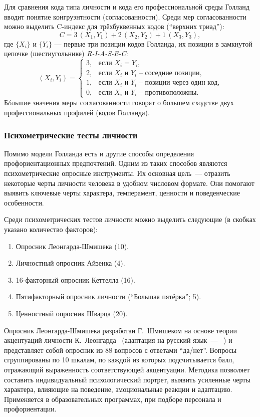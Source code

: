 \label{subsec:cindex}
Для сравнения кода типа личности и кода его профессиональной среды Голланд вводит понятие конгруэнтности (согласованности). Среди мер согласованности можно выделить C‑индекс для трёхбуквенных кодов (\enquote{верхних триад}):
  \[
    C = 3\, (X_1, Y_1) + 2\, (X_2, Y_2) + 1\, (X_3, Y_3),
  \]
  где $\{X_i\}$ и $\{Y_i\}$ — первые три позиции кодов Голланда, их позиции в замкнутой цепочке (шестиугольнике) \textit{R-I-A-S-E-C}:
  \[
    (X_i, Y_i) =
    \begin{cases}
      3, & \text{если $X_i = Y_i$,}\\
      2, & \text{если $X_i$ и $Y_i$ -- соседние позиции,}\\
      1, & \text{если $X_i$ и $Y_i$ -- позиции через один код,}\\
      0, & \text{если $X_i$ и $Y_i$ -- противоположны.}
    \end{cases}
  \]
Б\'oльшие значения меры согласованности говорят о большем сходстве двух профессиональных профилей (кодов Голланда). 


\subsubsection{Психометрические тесты личности}
\label{sec:psytests}

Помимо модели Голланда есть и другие способы определения проф\-ори\-ента\-цион\-ных предпочтений. Одним из таких способов являются пси\-хо\-мет\-ри\-чес\-кие опросные инструменты. Их основная цель~--- отразить некоторые черты личности человека в удобном числовом формате. Они помогают выявить ключевые черты характера, тем\-пе\-ра\-мент, цен\-ности и по\-ве\-ден\-ческие особенности. 

Среди психометрических тестов личности можно выделить следующие (в скобках указано количество факторов):
    \begin{enumerate}[noitemsep, topsep=0pt, parsep=0pt, partopsep=0pt]
        \item Опросник Леонгарда-Шмишека (10).
        \item Личностный опросник Айзенка (4).
        \item 16-факторный опросник Кеттелла (16).
        \item Пятифакторный опросник личности (\enquote{Большая пятёрка}; 5).
        \item Ценностный опросник Шварца (20).
    \end{enumerate}

Опросник Леонгарда-Шмишека разработан Г.~Шмишеком на основе теории акцентуаций личности К.~Леонгарда~\cite{Schmieschek} (адаптация на русский язык~--- ~\cite{Kortneva}) и представляет собой опросник из 88 вопросов с ответами \enquote{да/нет}. Вопросы сгруппированы по 10 шкалам, по каждой из которых подсчитывается балл, отражающий выраженность соответствующей акцентуации. Методика позволяет составить индивидуальный психологический портрет, выявить усиленные черты характера, влияющие на поведение, эмоциональные реакции и адаптацию. Применяется в образовательных программах, при подборе персонала и профориентации.

